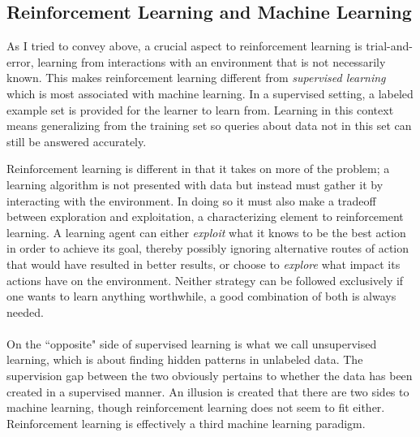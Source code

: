 \subsection{Reinforcement Learning and Machine Learning}
As I tried to convey above,
a crucial aspect to reinforcement learning
is trial-and-error, learning from interactions
with an environment that is not necessarily known.
This makes reinforcement learning different from
\textit{supervised learning}
which is most associated with machine learning.
In a supervised setting,
a labeled example set is provided
for the learner to learn from.
Learning in this context means generalizing from the training set
so queries about data not in this set
can still be answered accurately.

Reinforcement learning is different
in that it takes on more of the problem;
a learning algorithm is not presented with data
but instead must gather it by interacting with the environment.
In doing so it must also make a tradeoff between exploration and exploitation,
a characterizing element to reinforcement learning.
A learning agent can either \textit{exploit}
what it knows to be the best action in order to achieve its goal,
thereby possibly ignoring alternative routes of action
that would have resulted in better results,
or choose to \textit{explore}
what impact its actions have on the environment.
Neither strategy can be followed exclusively
if one wants to learn anything worthwhile,
a good combination of both is always needed.

\paragraph{}
On the ``opposite" side of supervised learning
is what we call unsupervised learning,
which is about finding hidden patterns in unlabeled data.
The supervision gap between the two obviously pertains
to whether the data has been created in a supervised manner.
An illusion is created that there are two sides to machine learning,
though reinforcement learning does not seem to fit either.
Reinforcement learning is effectively a third machine learning paradigm.


